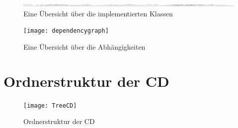 \begin{figure}[htp]
	\centering
	\captionsetup{justification=centering}
	\includegraphics[width=1\textwidth]{Overview}
	\caption[Überblick Klassen]{Eine Übersicht über die implementierten Klassen}
	\label{fig:overviewClasses}
\end{figure}

\begin{figure}[htp]
	\centering
	\captionsetup{justification=centering}
	\texttt{[image: dependencygraph]}
	\caption[Überblick Abhängigkeiten]{Eine Übersicht über die Abhängigkeiten}
	\label{fig:overviewDep}
\end{figure}

\section{Ordnerstruktur der CD}
\label{sec:treeCD}

\begin{figure}[htp]
	\centering
	\captionsetup{justification=centering}
	\texttt{[image: TreeCD]}
	\caption[Ordnerstruktur CD]{Ordnerstruktur der CD}
	\label{fig:TreeCD}
\end{figure}